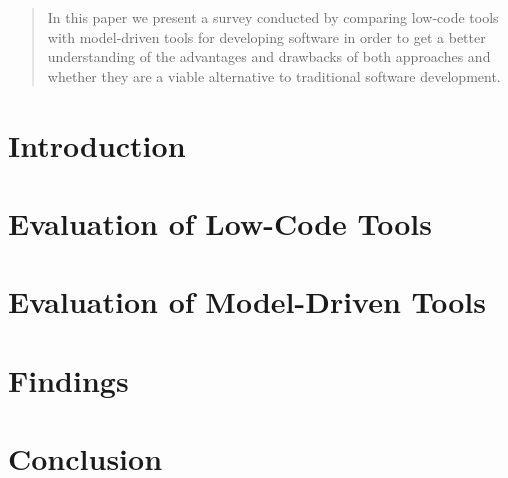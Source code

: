 \documentclass[runningheads]{llncs}
\begin{document}

\maketitle

\vspace{8em}

\begin{abstract}

In this paper we present a survey conducted by comparing low-code tools with model-driven tools for developing software in order to get a better understanding of the advantages and drawbacks of both approaches and whether they are a viable alternative to traditional software development.


\end{abstract}

\newpage

\section{Introduction}
\label{sec:introduction}

\section{Evaluation of Low-Code Tools}
\label{sec:evaluation_of_low_code_tools}

\section{Evaluation of Model-Driven Tools}
\label{sec:evaluation_of_model_driven_tools}

\section{Findings}
\label{sec:findings}

\section{Conclusion}
\label{sec:conclusion}

\newpage
\printbibliography
\end{document}

